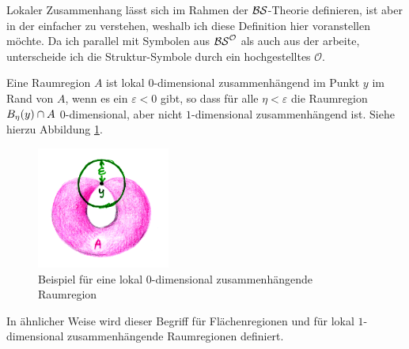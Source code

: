     Lokaler Zusammenhang lässt sich im Rahmen der $\mathcal{BS}$-Theorie definieren, ist aber in der \strukt einfacher zu verstehen, weshalb ich diese Definition hier voranstellen möchte.
    Da ich parallel mit Symbolen aus $\mathcal{BS}^{\mathcal{O}}$ als auch aus der \strukt arbeite, unterscheide ich die Struktur-Symbole durch ein hochgestelltes $\mathcal{O}$.

    Eine Raumregion $A$ ist lokal $0$-dimensional zusammenhängend im Punkt $y$ im Rand von $A$, wenn es ein $\varepsilon < 0$ gibt, so dass für alle $\eta < \varepsilon$ die Raumregion $B_{\eta}(y) \cap A$ $0$-dimensional, aber nicht $1$-dimensional zusammenhängend ist. Siehe hierzu Abbildung \ref{fig:loc0dc}.
%
    \begin{figure}[ht]
        \centering
        \includegraphics[height=4cm]{abb/loc0dc.png}
        \caption{Beispiel für eine lokal $0$-dimensional zusammenhängende Raumregion}
        \label{fig:loc0dc}
    \end{figure}
%
    In ähnlicher Weise wird dieser Begriff für Flächenregionen und für lokal $1$-dimensional zusammenhängende Raumregionen definiert.
%

